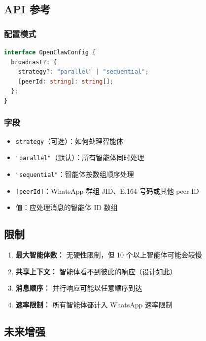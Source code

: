 \subsection{API 参考}


\subsubsection{配置模式}


\begin{lstlisting}[language=typescript]
interface OpenClawConfig {
  broadcast?: {
    strategy?: "parallel" | "sequential";
    [peerId: string]: string[];
  };
}
\end{lstlisting}


\subsubsection{字段}


\begin{itemize}
  \item \texttt{strategy}（可选）：如何处理智能体
  \item \texttt{"parallel"}（默认）：所有智能体同时处理
  \item \texttt{"sequential"}：智能体按数组顺序处理
  \item \texttt{[peerId]}：WhatsApp 群组 JID、E.164 号码或其他 peer ID
  \item 值：应处理消息的智能体 ID 数组
\end{itemize}


\subsection{限制}


\begin{enumerate}
  \item \textbf{最大智能体数：} 无硬性限制，但 10 个以上智能体可能会较慢
  \item \textbf{共享上下文：} 智能体看不到彼此的响应（设计如此）
  \item \textbf{消息顺序：} 并行响应可能以任意顺序到达
  \item \textbf{速率限制：} 所有智能体都计入 WhatsApp 速率限制
\end{enumerate}


\subsection{未来增强}



